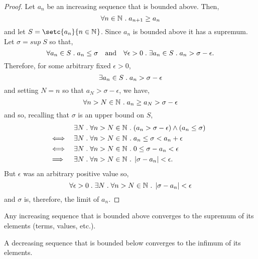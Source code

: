 \documentclass[../MathsNotesBase.tex]{subfiles}
\begin{document}
{		\bigskip
		\begin{proof}
			Let $a_n$ be an increasing sequence that is bounded above. Then,
			\[ \forall n \in \mathbb{N}^{} \;.\; a_{n+1} \geq a_n \]
			and let ${ S = \setc{a_n}{n \in \N{}} }$. Since $a_n$ is bounded above it has a supremum. Let $ \sigma = sup \; S $ so that,
			\[ \forall a_n \in S \;.\; a_n \leq \sigma \hspace{10pt}\text{and}\hspace{10pt} \forall \epsilon > 0 \;.\; \exists a_n \in S \;.\; a_n > \sigma - \epsilon. \]
			Therefore, for some arbitrary fixed $\epsilon > 0$,
			\[ \exists a_n \in S \;.\; a_n > \sigma - \epsilon \] 
			and setting $ N = n $ so that $ a_N > \sigma - \epsilon $, we have,
			\[ \forall n > N \in \mathbb{N}^{} \;.\; a_n \geq a_N > \sigma - \epsilon \]
			and so, recalling that $\sigma$ is an upper bound on $S$,
			\begin{align*}
			&& \exists N \;.\; \forall n > N \in \mathbb{N}^{} &\;.\; (a_n > \sigma - \epsilon) \wedge (a_n \leq \sigma) \\
			&\iff &\exists N \;.\; \forall n > N \in \mathbb{N}^{} &\;.\; a_n \leq \sigma < a_n + \epsilon  &\text{\scriptsize{}}\\
			&\iff &\exists N \;.\; \forall n > N \in \mathbb{N}^{} &\;.\; 0 \leq \sigma - a_n < \epsilon  &\text{\scriptsize{}}\\
			&\implies &\exists N \;.\; \forall n > N \in \mathbb{N}^{} &\;.\; \left\lvert\sigma - a_n\right\rvert < \epsilon.
			\end{align*}
			But $\epsilon$ was an arbitrary positive value so,
			\[ \forall \epsilon > 0 \;.\; \exists N \;.\; \forall n > N \in \mathbb{N}^{} \;.\; \left\lvert\sigma - a_n\right\rvert < \epsilon \]
			and $\sigma$ is, therefore, the limit of $a_n.$
		\end{proof}
		
		\bigskip
		\begin{corollary}
			Any increasing sequence that is bounded above converges to the supremum of its elements (terms, values, etc.).
		\end{corollary}
		\begin{corollary}
			A decreasing sequence that is bounded below converges to the infimum of its elements.
		\end{corollary}
	}
\end{document}
